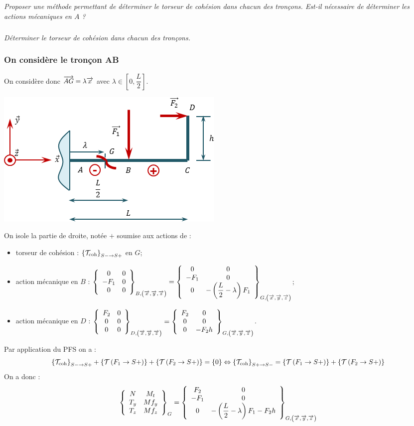 \documentclass[10pt,fleqn]{article} %
\begin{document}
\begin{multicols}{2}
\subparagraph{}
\textit{Proposer une méthode permettant de déterminer le torseur de cohésion dans chacun des tronçons. Est-il nécessaire de déterminer les actions mécaniques en $A$ ?}

\subparagraph{}
\textit{Déterminer le torseur de cohésion dans chacun des tronçons.}


\ifprof
\begin{corrige}
\subsubsection*{On considère le tronçon AB}
On considère donc $\vect{AG} = \lambda \vect{x}$ avec $\lambda\in \left[0,\dfrac{L}{2}\right]$.
\begin{center}
\includegraphics[width=.45\textwidth]{images/exo_08_corr_01}
\end{center}


On isole la partie de droite, notée $+$ soumise aux actions de :
\begin{itemize}[label=,font=\color{ocre}] 
\item torseur de cohésion : $\torseurscoh_{S-\rightarrow S+}$ en $G$;
\item action mécanique en $B$ : $\torseurcol{0}{-F_1}{0}{0}{0}{0}{B,\left( \vect{x},\vect{y},\vect{z} \right)}  =\torseurcol{0}{-F_1}{0}{0}{0}{-\left(\dfrac{L}{2}-\lambda \right)F_1}{G,\left( \vect{x},\vect{y},\vect{z} \right)} $;
\item action mécanique en $D$ : $\torseurcol{F_2}{0}{0}{0}{0}{0}{D,\left( \vect{x},\vect{y},\vect{z} \right)}  =\torseurcol{F_2}{0}{0}{0}{0}{-F_2h}{G,\left( \vect{x},\vect{y},\vect{z} \right)} $.
\end{itemize}


Par application du PFS on a : 
$$ \torseurscoh_{S-\rightarrow S+} +\torseurstat{T}{F_1}{S+} +\torseurstat{T}{F_2}{S+} = \{0\} \Leftrightarrow \torseurscoh_{S+\rightarrow S-} =\torseurstat{T}{F_1}{S+} +\torseurstat{T}{F_2}{S+}  $$
On a donc  :
$$
\torseurcol{N}{T_y}{T_z}{M_t}{Mf_y}{Mf_z}{G} = 
\torseurcol{F_2}{-F_1}{0}{0}{0}{-\left(\dfrac{L}{2}-\lambda \right)F_1-F_2h}{G,\left( \vect{x},\vect{y},\vect{z} \right)}
$$


\end{corrige}
\end{multicols}
\end{document}
